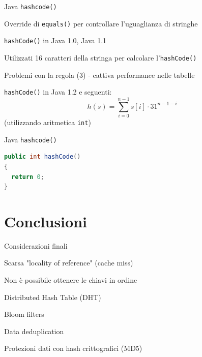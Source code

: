 \begin{frame}{Java \texttt{hashcode()}}

\vspace{-6pt}
\BIL
\item Override di \texttt{equals()} per controllare l’uguaglianza di stringhe
\item \texttt{hashCode()} in Java 1.0, Java 1.1
\BI
\item Utilizzati 16 caratteri della stringa per calcolare l’\texttt{hashCode()}
\item Problemi con la regola (3) - cattiva performance nelle tabelle
\EI
\item \texttt{hashCode()} in Java 1.2 e seguenti:
\[
  h(s) = \sum_{i=0}^{n-1} s[i] \cdot 31^{n-1-i}
\]
(utilizzando aritmetica \texttt{int})
\EIL

\end{frame}


\begin{frame}[fragile]{Java \texttt{hashcode()}}

\vspace{-6pt}

\begin{lstlisting}[language=java]
public int hashCode()
{
  return 0;
}
\end{lstlisting}

\end{frame}

\section{Conclusioni}

\begin{frame}{Considerazioni finali}
	
\vspace{-6pt}
\BI
\item Scarsa "locality of reference" (cache miss)
\item Non è possibile ottenere le chiavi in ordine
\EI

\medskip
{}
\BI
\item Distributed Hash Table (DHT)
\item Bloom filters
\EI

\medskip
{}
\BI
\item Data deduplication
\item Protezioni dati con hash crittografici (MD5)
\EI

\end{frame}

	



